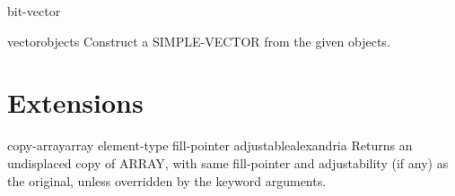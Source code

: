 \begin{class}{bit-vector}{}{}{}
  
\end{class}

\begin{class}{vector}{\rest objects}{}{}
  Construct a SIMPLE-VECTOR from the given objects.
\end{class}

\section{Extensions}
\label{sec:extensions}

\begin{function}{copy-array}{array \key element-type fill-pointer adjustable}{alexandria}{}
  Returns an undisplaced copy of ARRAY, with same fill-pointer
and adjustability (if any) as the original, unless overridden by
the keyword arguments.
\end{function}
